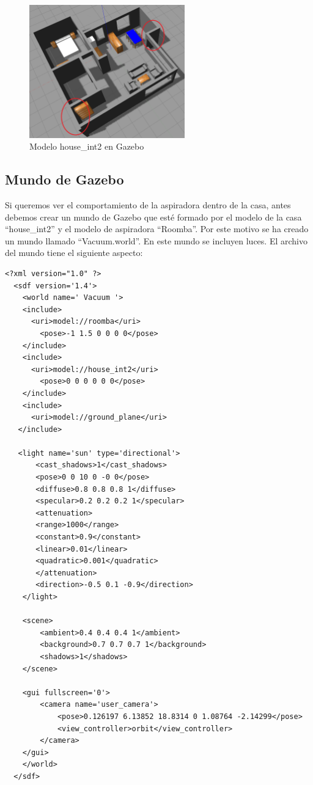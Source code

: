 \begin{figure}[H]
  \begin{center}
    \includegraphics[width=0.6\textwidth]{figures/Vacuum/casa.png}
		\caption{Modelo house\_int2 en Gazebo}
		\label{fig.casa}
		\end{center}
\end{figure}

\subsection{Mundo de Gazebo}
Si queremos ver el comportamiento de la aspiradora dentro de la casa, antes debemos crear un mundo de Gazebo que esté formado por el modelo de la casa ``house\_int2'' y el modelo de aspiradora ``Roomba''. Por este motivo se ha creado un mundo llamado ``Vacuum.world''. En este mundo se incluyen luces. El archivo del mundo tiene el siguiente aspecto:

\vspace{20pt}
	\begin{lstlisting}[frame=single]
<?xml version="1.0" ?>
  <sdf version='1.4'>
    <world name=' Vacuum '>
    <include>
      <uri>model://roomba</uri>
        <pose>-1 1.5 0 0 0 0</pose>
    </include>
    <include>
      <uri>model://house_int2</uri>
        <pose>0 0 0 0 0 0</pose>
    </include>
    <include>
      <uri>model://ground_plane</uri>
   </include>

   <light name='sun' type='directional'>
       <cast_shadows>1</cast_shadows>
       <pose>0 0 10 0 -0 0</pose>
       <diffuse>0.8 0.8 0.8 1</diffuse>
       <specular>0.2 0.2 0.2 1</specular>
       <attenuation>
       <range>1000</range>
       <constant>0.9</constant>
       <linear>0.01</linear>
       <quadratic>0.001</quadratic>
       </attenuation>
       <direction>-0.5 0.1 -0.9</direction>
    </light>

    <scene>
        <ambient>0.4 0.4 0.4 1</ambient>
        <background>0.7 0.7 0.7 1</background>
        <shadows>1</shadows>
    </scene>

    <gui fullscreen='0'>
        <camera name='user_camera'>
            <pose>0.126197 6.13852 18.8314 0 1.08764 -2.14299</pose>
            <view_controller>orbit</view_controller>
        </camera>
    </gui>
    </world>
  </sdf>

	\end{lstlisting}

